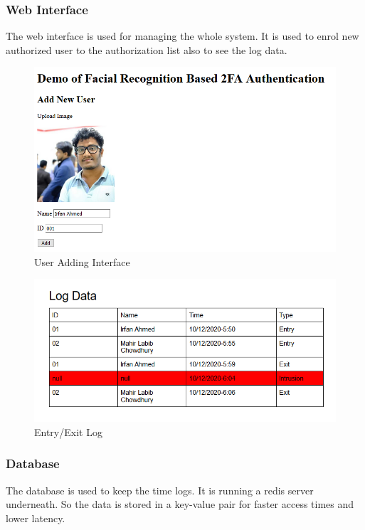         \subsubsection{Web Interface}
        \begin{flushleft}
            The web interface is used for managing the whole system. It is used to enrol new authorized user to the
            authorization list also to see the log data.
        \end{flushleft}
        \begin{figure}[H]
            \centering
            \includegraphics[width=14cm]{images/adduser.png}
            \caption{User Adding Interface}
        \end{figure}

        \begin{figure}[H]
            \centering
            \includegraphics[width=14cm]{images/log.png}
            \caption{Entry/Exit Log }
        \end{figure}

        \subsubsection{Database}
        \begin{flushleft}
            The database is used to keep the time logs. It is running a redis server underneath. So the data is stored 
            in a key-value pair for faster access times and lower latency.
        \end{flushleft}




